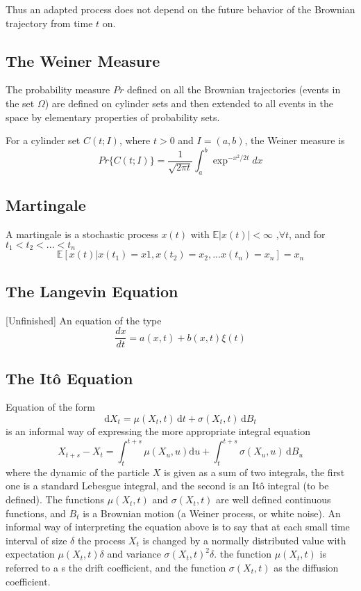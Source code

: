 \documentclass[12pt]{report}
\begin{document}
Thus an adapted process does not depend on the future behavior of the Brownian trajectory from time $t$ on.

\subsection{The Weiner Measure}\label{theWeinerMeasure}
The probability measure $Pr$ defined on all the Brownian trajectories (events in the set $\Omega$) are defined on cylinder sets and then extended to all events in the space by elementary properties of probability sets.

For a cylinder set $C(t;I)$, where $t>0$ and $I=(a,b)$, the Weiner measure is 
\begin{equation*}
Pr\{C(t;I)\}=\frac{1}{\sqrt{2\pi t}}\int_a^b\exp^{-x^2/2t}dx
\end{equation*}

\subsection{Martingale}
A martingale is a stochastic process $ x(t)$ with $\mathbb{E}|x(t)|<\infty$ ,$\forall t$, and for $t_1<t_2<...<t_n$
\begin{equation*}
\mathbb{E}[x(t)|x(t_1)=x1,x(t_2)=x_2,...x(t_n)=x_n]=x_n
\end{equation*}

\subsection{The Langevin Equation}{[Unfinished]}
An equation of the type 
\begin{equation*}
\frac{dx}{dt}=a(x,t)+b(x,t)\xi(t)
\end{equation*}

\subsection{The It\^{o} Equation}
Equation of the form 
\begin{equation*}
 \mathrm{d} X_t = \mu(X_t,t)\, \mathrm{d} t +  \sigma(X_t,t)\, \mathrm{d} B_t
\end{equation*}
is an informal way of expressing the more appropriate integral equation 
\begin{equation*}
X_{t+s} - X_{t} = \int_t^{t+s} \mu(X_u,u) \mathrm{d} u + \int_t^{t+s} \sigma(X_u,u)\, \mathrm{d} B_u
\end{equation*}
where the dynamic of the particle $X$ is given as a sum of two integrals, the first one is a standard Lebesgue integral, and the second is an It\^{o} integral (to be defined).  
The functions $\mu(X_t,t)$ and $\sigma(X_t,t)$ are well defined continuous functions, and $B_t$ is a Brownian motion (a Weiner process, or white noise). An informal way of interpreting the equation above is to say that at each small time interval of size $\delta$ the process $X_t$ is changed by a normally distributed value with expectation $\mu(X_t,t)\delta$ and variance $\sigma(X_t,t)^2\delta$. 
the function $\mu(X_t,t)$ is referred to a s the drift coefficient, and the function $\sigma(X_t,t)$ as the diffusion coefficient. 
\end{document}
